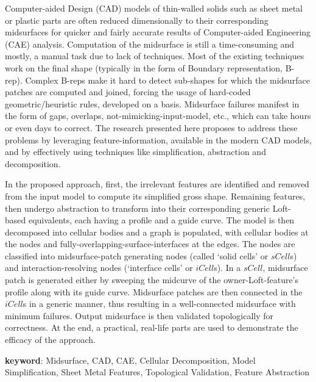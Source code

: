 

Computer-aided Design (CAD) models of thin-walled solids such as sheet metal or plastic parts are often reduced dimensionally to their corresponding midsurfaces for quicker and fairly accurate results of Computer-aided Engineering (CAE) analysis. Computation of the midsurface is still a time-consuming and mostly, a manual task due to lack of  techniques. Most of the existing techniques work on the final shape (typically in the form of Boundary representation, B-rep). Complex B-reps make it hard to detect sub-shapes for which the midsurface patches are computed and joined, forcing the usage of hard-coded geometric/heuristic rules, developed on a   basis. Midsurface failures manifest in the form of gaps, overlaps, not-mimicking-input-model, etc., which can take hours or even days to correct.  The research presented here proposes to address these problems by leveraging feature-information, available in the modern CAD models, and by effectively using techniques like simplification, abstraction and decomposition. 

In the proposed approach, first, the irrelevant features are identified and removed from the input  model to compute its simplified gross shape. Remaining features, then undergo abstraction to transform into their corresponding generic Loft-based equivalents, each having a profile and a guide curve. The model is then decomposed into cellular bodies and a graph is populated, with cellular bodies at the nodes and fully-overlapping-surface-interfaces at the edges. The nodes are classified into midsurface-patch generating nodes (called `solid cells' or $sCell$s) and interaction-resolving nodes (`interface cells' or $iCell$s). In a $sCell$, midsurface patch is generated either by  sweeping the midcurve of the owner-Loft-feature's profile along with its guide curve. Midsurface patches are then connected in the $iCell$s in a generic manner, thus resulting in a well-connected midsurface with minimum failures. Output midsurface is then validated topologically for correctness. At the end, a practical, real-life parts are used to demonstrate the efficacy of the approach.

\vspace{0.25cm}

\textbf{keyword}: Midsurface, CAD, CAE, Cellular Decomposition, Model Simplification, Sheet Metal Features, Topological Validation, Feature Abstraction


